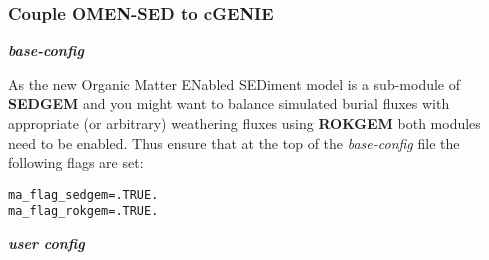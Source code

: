 %
\subsubsection*{Couple OMEN-SED to cGENIE}

\textbf{\textit{base-config}}
\vspace{1mm}

\noindent As the new Organic Matter ENabled SEDiment model is a sub-module of \textbf{SEDGEM} and you might want to balance simulated burial fluxes with appropriate (or arbitrary) weathering fluxes using \textbf{ROKGEM} both modules need to be enabled.
Thus ensure that at the top of the \textit{base-config} file the following flags are set:
\vspace{-1mm}\small\begin{verbatim}
ma_flag_sedgem=.TRUE.
ma_flag_rokgem=.TRUE.
\end{verbatim}\normalsize\vspace{-1mm}

\noindent \textbf{\textit{user config}}
\vspace{1mm}

